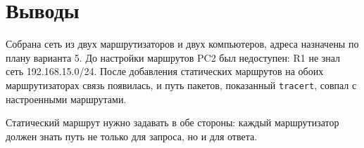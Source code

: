 \section{Выводы}
Собрана сеть из двух маршрутизаторов и двух компьютеров, адреса назначены по плану
варианта 5. До настройки маршрутов PC2 был недоступен: R1 не знал сеть 192.168.15.0/24.
После добавления статических маршрутов на обоих маршрутизаторах связь появилась, и путь
пакетов, показанный \texttt{tracert}, совпал с настроенными маршрутами.

Статический маршрут нужно задавать в обе стороны: каждый маршрутизатор должен знать путь
не только для запроса, но и для ответа.
